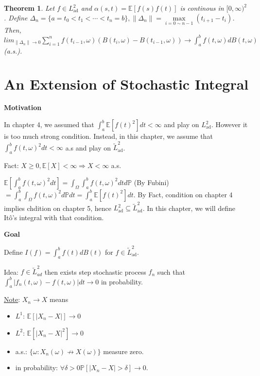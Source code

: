 \documentclass[12pt]{report}
\renewcommand{\P}{\mathbb{P}}
\newcommand{\E}{\mathbb{E}}
\renewcommand{\1}{\mathbb{1}}
\renewcommand{\O}{\Omega}
\renewcommand{\subset}{\subseteq}
\theoremstyle{break}
\newtheorem{thm}{Theorem}[section] %
\theoremstyle{newdef}
\theoremstyle{remark}
\begin{document}
\begin{thm}
Let $f \in L^2_{\text{ad}}$ and $\alpha(s,t) = \E[f(s)f(t)]$ is continous in $[0,\infty)^2$.
Define $\Delta_n = \{ a = t_0 < t_1 < \cdots < t_n = b \}, \|\Delta_n\| = \max\limits_{i = 0 \sim n-1} (t_{i+1} - t_i)$.
Then, $lim_{\|\Delta_n\|\rightarrow 0} \sum_{i=1}^{n} f(t_{i-1}, \omega)(B(t_i,\omega) - B(t_{i-1},\omega)) \rightarrow \int_a^b f(t,\omega) dB(t,\omega)$ (a.s.).
\end{thm}





\chapter{An Extension of Stochastic Integral}
\textbf{Motivation}

In chapter 4, we assumed that $\int_a^b \E[f(t)^2]dt < \infty$ and play on $L^2_\text{ad}$.
However it is too much strong condition.
Instead, in this chapter, we assume that $\int_a^b f(t,\omega)^2 dt < \infty$ a.s and play on $\widetilde L^2_{\text{ad}}$.

Fact: $X \geq 0, \E[X] < \infty \Rightarrow X < \infty$ a.s.

$\E[\int_a^b f(t,\omega)^2 dt] = \int_\O\int_a^b f(t,\omega)^2 dt d\P$ (By Fubini)
$= \int_a^b \int_\O f(t,\omega)^2 d\P dt = \int_a^b \E[f(t)^2] dt$.
By Fact, condition on chapter 4 implies chdition on chapter 5, hence $L^2_{\text{ad}} \subset \widetilde L^2_{\text{ad}}$.
In this chapter, we will define It\^o's integral with that condition.

\vspace{5mm}

\textbf{Goal}

Define $I(f) = \int_a^b f(t)dB(t)$ for $f \in \widetilde{L}^2_{\text{ad}}$.

Idea: $f \in \widetilde L^2_{ad}$ then exists step stochastic process $f_n$ such that $\int_a^b |f_n(t,\omega) - f(t,\omega)| dt \rightarrow 0$ in probability.

\underline{Note}: $X_n \rightarrow X$ means
\begin{itemize}
\item $L^1$: $\E[|X_n - X|] \rightarrow 0$
\item $L^2$: $\E[|X_n - X|^2] \rightarrow 0$
\item a.s.: $\{ \omega : X_n(\omega) \not\rightarrow X(\omega)\}$ measure zero.
\item in probability: $\forall \delta > 0 \P[|X_n - X| > \delta] \rightarrow 0$.
\end{itemize}
\end{document}
